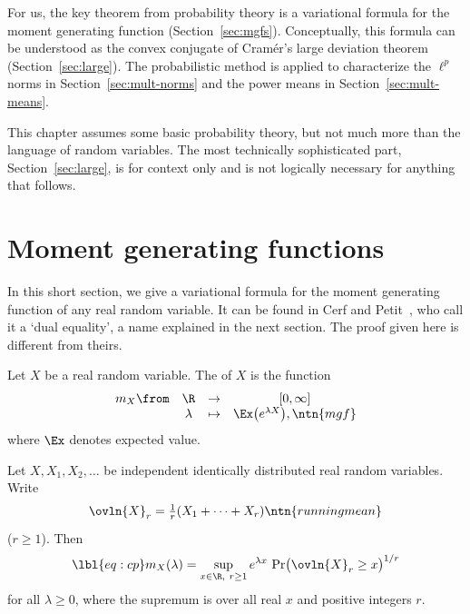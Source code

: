 For us, the key theorem from probability theory is a variational formula
for the moment generating function (Section~\ref{sec:mgfs}).  Conceptually,
this formula can be understood as the convex conjugate of Cram\'er's large
deviation theorem (Section~\ref{sec:large}).  The probabilistic method is
applied to characterize the $\ell^p$ norms in Section~\ref{sec:mult-norms}
and the power means in Section~\ref{sec:mult-means}.

This chapter assumes some basic probability theory, but not much more than
the language of random variables.  The most technically sophisticated part,
Section~\ref{sec:large}, is for context only and is not logically necessary
for anything that follows.


\section{Moment generating functions}


In this short section, we give a variational formula for the moment
generating function of any real random variable.  It can be found in Cerf%
% 
% 
and Petit~\cite{CePe},%
% 
% 
who call it a `dual equality', a name explained in
the next section.  The proof given here is different from theirs.

Let $X$ be a real random variable.  The 
of $X$ is the function 
\[
\begin{array}{cccc}
m_X\from        &\R             &\to            &[0, \infty]            \\
                &\lambda        &\mapsto        &\Ex\bigl(e^{\lambda X}\bigr),
\ntn{mgf}
\end{array}
\]
where $\Ex$ denotes expected value.

\begin{thm}
Let $X, X_1, X_2, \ldots$ be independent identically distributed real
random variables.  Write
\[
\ovln{X}_r
=
\tfrac{1}{r}(X_1 + \cdots + X_r)
\ntn{runningmean}
\]
($r \geq 1$).  Then
% 
\begin{equation}
\lbl{eq:cp}
m_X(\lambda)
=
\sup_{x \in \R, \ r \geq 1}
e^{\lambda x} \, \Pr\bigl(\ovln{X}_r \geq x\bigr)^{1/r} 
\end{equation}
% 
for all $\lambda \geq 0$, where the supremum is over all real $x$ and
positive integers $r$.
\end{thm}

